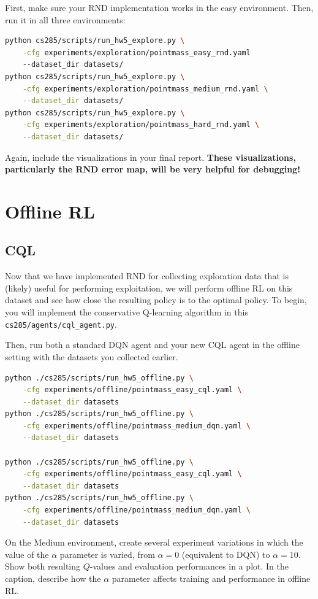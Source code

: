 \documentclass{article}
\begin{document}
First, make sure your RND implementation works in the easy environment. Then, run it in all three environments:
\begin{lstlisting}[language=bash]
python cs285/scripts/run_hw5_explore.py \
    -cfg experiments/exploration/pointmass_easy_rnd.yaml
    --dataset_dir datasets/
python cs285/scripts/run_hw5_explore.py \
    -cfg experiments/exploration/pointmass_medium_rnd.yaml \
    --dataset_dir datasets/
python cs285/scripts/run_hw5_explore.py \
    -cfg experiments/exploration/pointmass_hard_rnd.yaml \
    --dataset_dir datasets/
\end{lstlisting}

Again, include the visualizations in your final report. \textbf{These visualizations, particularly the RND error map, will be very helpful for debugging!}

\section{Offline RL}

\subsection{CQL}
Now that we have implemented RND for collecting exploration data that is (likely) useful for performing exploitation, we will perform offline RL on this dataset and see how close the resulting policy is to the optimal policy. To begin, you will implement the conservative Q-learning algorithm in this \verb+cs285/agents/cql_agent.py+.

Then, run both a standard DQN agent and your new CQL agent in the offline setting with the datasets you collected earlier.

\begin{lstlisting}[language=bash]
python ./cs285/scripts/run_hw5_offline.py \
    -cfg experiments/offline/pointmass_easy_cql.yaml \
    --dataset_dir datasets
python ./cs285/scripts/run_hw5_offline.py \
    -cfg experiments/offline/pointmass_medium_dqn.yaml \
    --dataset_dir datasets

python ./cs285/scripts/run_hw5_offline.py \
    -cfg experiments/offline/pointmass_easy_cql.yaml \
    --dataset_dir datasets
python ./cs285/scripts/run_hw5_offline.py \
    -cfg experiments/offline/pointmass_medium_dqn.yaml \
    --dataset_dir datasets
\end{lstlisting}

On the Medium environment, create several experiment variations in which the value of the $\alpha$ parameter is varied, from $\alpha=0$ (equivalent to DQN) to $\alpha=10$. Show both resulting $Q$-values and evaluation performances in a plot. In the caption, describe how the $\alpha$ parameter affects training and performance in offline RL.
\end{document}
